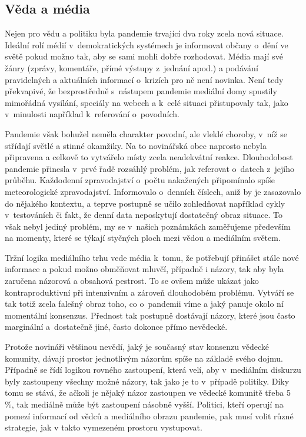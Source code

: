 \subsection*{Věda a média}

\vspace{-0.3eM}

Nejen pro vědu a politiku byla pandemie trvající dva roky zcela nová situace. Ideální rolí médií v~demokratických systémech je informovat občany o~dění ve světě pokud možno tak, aby se sami mohli dobře rozhodovat. Média mají své žánry (zprávy, komentáře, přímé výstupy z~jednání apod.) a podávání pravidelných a aktuálních informací o~krizích pro ně není novinka. Není tedy překvapivé, že bezprostředně s~nástupem pandemie mediální domy spustily mimořádná vysílání, speciály na we\-bech a k~celé situaci přistupovaly tak, jako v~minulosti například k~referování o~povodních.

Pandemie však bohužel neměla charakter povodní, ale vleklé choroby, v~níž se střídají světlé a stinné okamžiky. Na to novinářská obec naprosto nebyla připravena a celkově to vytvářelo místy zcela neadekvátní reakce. Dlouhodobost pandemie přinesla v~prvé řadě rozsáhlý problém, jak referovat o~datech z~jejího průběhu. Každodenní zpravodajství o~počtu nakažených připomínalo spíše meteorologické zpravodajství. Informovalo o~denních číslech, aniž by je zasazovalo do nějakého kontextu, a teprve postupně se učilo zohledňovat například cykly v~testováních či fakt, že denní data neposkytují dostatečný obraz situace. To však nebyl jediný problém, my se v~našich poznámkách zaměřujeme především na momenty, které se týkají styčných ploch mezi vědou a mediálním světem.

Tržní logika mediálního trhu vede média k~tomu, že potřebují přinášet stále nové informace a pokud možno obměňovat mluvčí, případně i názory, tak aby byla zaručena názorová a obsahová pestrost. To se ovšem může ukázat jako kontraproduktivní při intenzivním a zároveň dlouhodobém problému. Vytváří se tak totiž zcela falešný obraz toho, co o~pandemii víme a jaký panuje okolo ní momentální konsenzus. Přednost tak postupně dostávají názory, které jsou často marginální a~dostatečně jiné, často dokonce přímo nevědecké.

Protože novináři většinou nevědí, jaký je současný stav konsenzu vědecké komunity, dávají prostor jednotlivým názorům spíše na základě svého dojmu. Případně se řídí logikou rovného zastoupení, která velí, aby v~mediálním diskurzu byly zastoupeny všechny možné názory, tak jako je to v~případě politiky. Díky tomu se stává, že ačkoli je nějaký názor zastoupen ve vědecké komunitě třeba 5 \%, tak mediálně může být zastoupení násobně vyšší. Politici, kteří operují na pomezí informací od vědců a mediálního obrazu pandemie, pak musí volit různé strategie, jak v takto vymezeném prostoru vystupovat.

